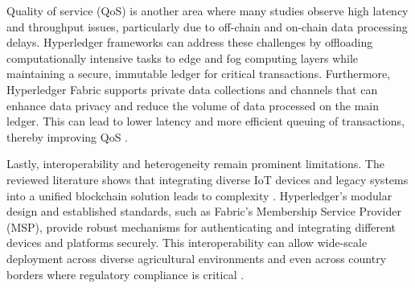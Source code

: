 \documentclass[12pt,onecolumn]{IEEEtran} %
\begin{document}
Quality of service (QoS) is another area where many studies \cite{ellahi2023blockchainbasedframeworksfor, ellahi2023blockchainbasedframeworksfor, khan2022ablockchainand} observe high latency and throughput issues, particularly due to off-chain and on-chain data processing delays. Hyperledger frameworks can address these challenges by offloading computationally intensive tasks to edge and fog computing layers while maintaining a secure, immutable ledger for critical transactions. Furthermore, Hyperledger Fabric supports private data collections and channels that can enhance data privacy and reduce the volume of data processed on the main ledger. This can lead to lower latency and more efficient queuing of transactions, thereby improving QoS \cite{khan2022ablockchainand, sizan2505asecuredtriad}.

Lastly, interoperability and heterogeneity remain prominent limitations. The reviewed literature shows that integrating diverse IoT devices and legacy systems into a unified blockchain solution leads to complexity \cite{aliyu2023blockchainbasedsmartfarm, tang2024assessingblockchainand}. Hyperledger's modular design and established standards, such as Fabric's Membership Service Provider (MSP), provide robust mechanisms for authenticating and integrating different devices and platforms securely. This interoperability can allow wide-scale deployment across diverse agricultural environments and even across country borders where regulatory compliance is critical \cite{sakthivel2024enhancingtransparencyand, bosona2023theroleof}.
\end{document}
